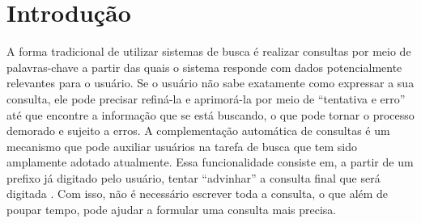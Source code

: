 \cleardoublepage
\chapter{Introdução}

 A forma tradicional de utilizar sistemas de busca é realizar consultas por meio de palavras-chave a partir das quais o sistema responde com dados potencialmente relevantes para o usuário. Se o usuário não sabe exatamente como expressar a sua consulta, ele pode precisar refiná-la e aprimorá-la por meio de ``tentativa e erro'' até que encontre a informação que se está buscando, o que pode  tornar o processo demorado e sujeito a erros. A complementação automática de consultas é um mecanismo que pode auxiliar usuários na tarefa de busca que tem sido amplamente adotado atualmente. Essa funcionalidade consiste em, a partir de um prefixo já digitado pelo usuário, tentar ``advinhar'' a consulta final que será digitada \citep{santo2015}. Com isso, não é necessário escrever toda a consulta, o que além de poupar tempo, pode ajudar a formular uma consulta mais precisa.

